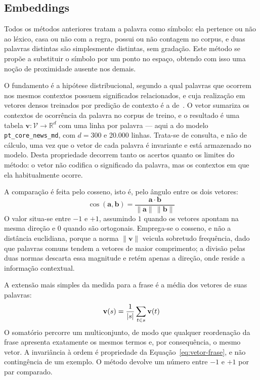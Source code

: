 \subsection{Embeddings}
\label{met:embeddings}

\indent\indent Todos os métodos anteriores tratam a palavra como símbolo: ela pertence ou não ao léxico, casa
ou não com a regra, possui ou não contagem no corpus, e duas palavras distintas são
simplesmente distintas, sem gradação. Este método se propõe a substituir o símbolo por um
ponto no espaço, obtendo com isso uma noção de proximidade ausente nos demais.

O fundamento é a hipótese distribucional, segundo a qual palavras que ocorrem nos mesmos
contextos possuem significados relacionados, e cuja realização em vetores densos treinados por
predição de contexto é a de~\textcite{mikolov2013}. O vetor sumariza os contextos de ocorrência
da palavra no corpus de treino, e o resultado é uma tabela
$\mathbf{v} : \mathcal{V} \to \mathbb{R}^{d}$ com uma linha por palavra --- aqui a do modelo
\texttt{pt\_core\_news\_md}, com $d = 300$ e 20.000 linhas. Trata-se de consulta, e não de
cálculo, uma vez que o vetor de cada palavra é invariante e está armazenado no modelo. Desta
propriedade decorrem tanto os acertos quanto os limites do método: o vetor não codifica o
significado da palavra, mas os contextos em que ela habitualmente ocorre.

A comparação é feita pelo cosseno, isto é, pelo ângulo entre os dois vetores:
%
\begin{equation}
\cos(\mathbf{a}, \mathbf{b})
= \frac{\mathbf{a} \cdot \mathbf{b}}{\lVert \mathbf{a}\rVert \, \lVert \mathbf{b}\rVert}
\label{eq:cosseno}
\end{equation}
%
O valor situa-se entre $-1$ e $+1$, assumindo $1$ quando os vetores apontam na mesma direção e
$0$ quando são ortogonais. Emprega-se o cosseno, e não a distância euclidiana, porque a norma
$\lVert \mathbf{v} \rVert$ veicula sobretudo frequência, dado que palavras comuns tendem a
vetores de maior comprimento; a divisão pelas duas normas descarta essa magnitude e retém
apenas a direção, onde reside a informação contextual.

A extensão mais simples da medida para a frase é a média dos vetores de suas palavras:
%
\begin{equation}
\mathbf{v}(s) = \frac{1}{|s|} \sum_{t \in s} \mathbf{v}(t)
\label{eq:vetor-frase}
\end{equation}
%
O somatório percorre um multiconjunto, de modo que qualquer reordenação da frase apresenta
exatamente os mesmos termos e, por consequência, o mesmo vetor. A invariância à ordem é
propriedade da Equação~\ref{eq:vetor-frase}, e não contingência de um exemplo. O método
devolve um número entre $-1$ e $+1$ por par comparado.
